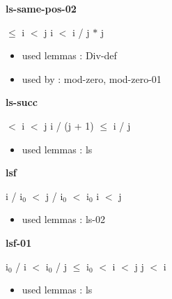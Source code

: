 \documentclass[a4paper]{article}
\begin{document}
\bigskip

{\large\bf ls-same-pos-02}

\medskip

  $\le$ i  $<$ j \Imp \Not i $<$ i / j $*$ j

\begin{itemize}


\item       used lemmas  : Div-def
\item       used by      : mod-zero, mod-zero-01

\end{itemize}

\medskip

\bigskip

{\large\bf ls-succ}

\medskip

  $<$ i  $<$ j \Imp i / (j + 1) $\le$ i / j

\begin{itemize}


\item       used lemmas  : ls

\end{itemize}

\medskip

\bigskip

{\large\bf lsf}

\medskip

 \Fol i / $\mbox{i}_{0}$ $<$ j / $\mbox{i}_{0}$  $<$ $\mbox{i}_{0}$ \Imp i $<$ j

\begin{itemize}


\item       used lemmas  : ls-02

\end{itemize}

\medskip

\bigskip

{\large\bf lsf-01}

\medskip

 \Fol $\mbox{i}_{0}$ / i $<$ $\mbox{i}_{0}$ / j  $\le$ $\mbox{i}_{0}$  $<$ i  $<$ j \Imp j $<$ i

\begin{itemize}


\item       used lemmas  : ls

\end{itemize}

\medskip
\end{document}

